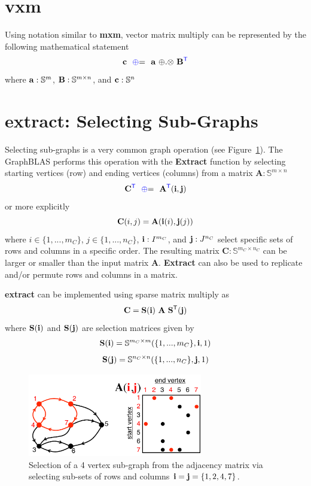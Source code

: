 \section{vxm}
  Using notation similar to {\bf mxm},  vector matrix multiply can be represented by the following mathematical statement
$$
   {\bf c} ~~ {\textcolor{blue}{\oplus}}{=} ~~ {\bf a} ~ {\oplus}.{\otimes} ~ {\bf B}^{\textcolor{blue}{\sf T}}
$$
where  ${\bf a}: \mathbb{S}^{m}$, ${\bf B}: \mathbb{S}^{m \times n}$, and ${\bf c}: \mathbb{S}^{n}$

\section{extract: Selecting Sub-Graphs}
  Selecting sub-graphs is a very common graph operation (see Figure~\ref{fig:AdjacencyMatrixSub}).  The GraphBLAS performs this operation with the {\bf Extract} function by selecting starting vertices (row) and ending vertices (columns) from a matrix $\mathbf{A} : \mathbb{S}^{m \times n}$
$$
   \mathbf{C}^{\textcolor{blue}{\sf T}} ~~ {\textcolor{blue}{\oplus}}{=} ~~  \mathbf{A}^{\textcolor{blue}{\sf T}}({\bf i},{\bf j})
$$
or more explicitly
$$
   {\bf C}(i,j) = {\bf A}({\bf i}(i),{\bf j}(j))
$$
where $i \in \{1,...,m_C\}$, $j \in \{1,...,n_C\}$, ${\bf i} : I^{m_C}$, and ${\bf j}: J^{n_C}$  select specific sets of rows and columns in a specific order.   The resulting matrix $\mathbf{C} : \mathbb{S}^{m_C \times n_C}$ can be larger or smaller than the input matrix $\mathbf{A}$.  {\bf Extract} can also be used to replicate and/or permute rows and columns in a matrix.

  {\bf extract} can be implemented using sparse matrix multiply as
$$
   \mathbf{C}= \mathbf{S}({\bf i}) ~ \mathbf{A} ~ \mathbf{S}^{\sf T}({\bf j})
$$
where $\mathbf{S}({\bf i})$ and $\mathbf{S}({\bf j})$ are selection matrices given by
$$
   \mathbf{S}({\bf i}) = \mathbb{S}^{m_C \times m}(\{1,...,m_C\},{\bf i},1)
$$
$$
    \mathbf{S}({\bf j}) = \mathbb{S}^{n_C \times n}(\{1,...,n_C\},{\bf j},1)
$$

\begin{figure}[!htb]
  \centering
    \includegraphics[width=3in]{figures/AdjacencyMatrixSub.pdf}
      \caption{Selection of a 4 vertex sub-graph from the adjacency matrix via selecting sub-sets of rows and columns ${\bf i} = {\bf j} = \{1,2,4,7\}$.}
      \label{fig:AdjacencyMatrixSub}
\end{figure}

